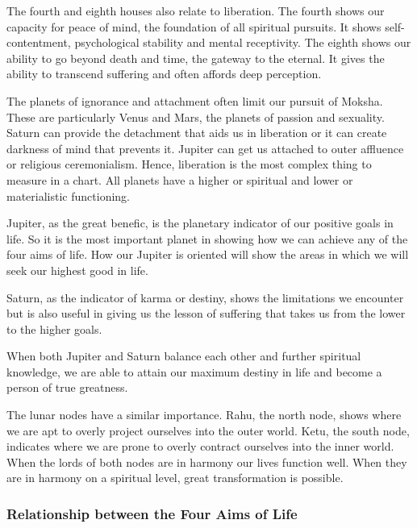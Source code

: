 

The fourth and eighth houses also relate to liberation. The fourth shows our capacity for peace of mind, the foundation of all spiritual pursuits. It shows self-contentment, psychological stability and mental receptivity. The eighth shows our ability to go beyond death and time, the gateway to the eternal. It gives the ability to transcend suffering and often affords deep perception.

 

The planets of ignorance and attachment often limit our pursuit of Moksha. These are particularly Venus and Mars, the planets of passion and sexuality. Saturn can provide the detachment that aids us in liberation or it can create darkness of mind that prevents it. Jupiter can get us attached to outer affluence or religious ceremonialism. Hence, liberation is the most complex thing to measure in a chart. All planets have a higher or spiritual and lower or materialistic functioning.

 

Jupiter, as the great benefic, is the planetary indicator of our positive goals in life. So it is the most important planet in showing how we can achieve any of the four aims of life. How our Jupiter is oriented will show the areas in which we will seek our highest good in life.

 

Saturn, as the indicator of karma or destiny, shows the limitations we encounter but is also useful in giving us the lesson of suffer­ing that takes us from the lower to the higher goals.

 

When both Jupiter and Saturn balance each other and further spiritual knowledge, we are able to attain our maximum destiny in life and become a person of true greatness.

 

The lunar nodes have a similar importance. Rahu, the north node, shows where we are apt to overly project ourselves into the outer world. Ketu, the south node, indicates where we are prone to overly contract ourselves into the inner world. When the lords of both nodes are in harmony our lives function well. When they are in harmony on a spiritual level, great transformation is possible.

 

\subsubsection{Relationship between the Four Aims of Life}


